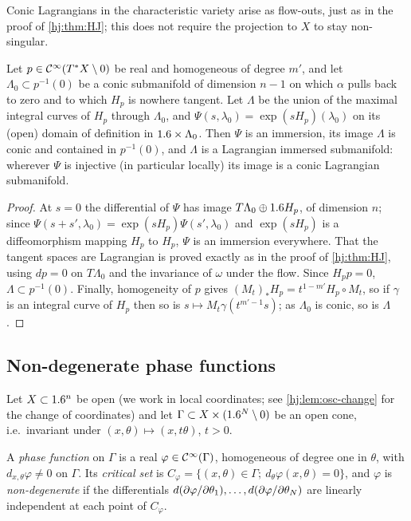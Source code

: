 Conic Lagrangians in the characteristic variety arise as flow-outs, just as in
the proof of \cref{hj:thm:HJ}; this does not require the projection to $X$ to
stay non-singular.

\begin{lemma}\label{hj:lem:flowout}
  Let $p\in\mathcal{C}^\infty(T^*X\setminus0)$ be real and homogeneous of degree $m'$, and let
  $\Lambda_0\subset p^{-1}(0)$ be a conic submanifold of dimension $n-1$ on which
  $\alpha$ pulls back to zero and to which $H_p$ is nowhere tangent.  Let
  $\Lambda$ be the union of the maximal integral curves of $H_p$ through
  $\Lambda_0$, and $\Psi(s,\lambda_0)=\exp(sH_p)(\lambda_0)$ on its (open) domain
  of definition in $1.6\times\Lambda_0$.  Then $\Psi$ is an immersion, its image
  $\Lambda$ is conic and contained in $p^{-1}(0)$, and $\Lambda$ is a Lagrangian
  immersed submanifold: wherever $\Psi$ is injective (in particular locally)
  its image is a conic Lagrangian submanifold.
\end{lemma}
\begin{proof}
  At $s=0$ the differential of $\Psi$ has image $T\Lambda_0\oplus1.6 H_p$, of
  dimension $n$; since $\Psi(s+s',\lambda_0)=\exp(sH_p)\Psi(s',\lambda_0)$ and
  $\exp(sH_p)$ is a diffeomorphism mapping $H_p$ to $H_p$, $\Psi$ is an
  immersion everywhere.  That the tangent spaces are Lagrangian is proved
  exactly as in the proof of \cref{hj:thm:HJ}, using $dp=0$ on $T\Lambda_0$ and
  the invariance of $\omega$ under the flow.  Since $H_pp=0$,
  $\Lambda\subset p^{-1}(0)$.  Finally, homogeneity of $p$ gives
  $(M_t)_*H_p=t^{1-m'}H_p\circ M_t$, so if $\gamma$ is an integral curve of $H_p$
  then so is $s\mapsto M_t\gamma(t^{m'-1}s)$; as $\Lambda_0$ is conic, so is
  $\Lambda$.
\end{proof}

\subsection{Non-degenerate phase functions}
Let $X\subset1.6^n$ be open (we work in local coordinates; see
\cref{hj:lem:osc-change} for the change of coordinates) and let
$\Gamma\subset X\times(1.6^N\setminus0)$ be an open cone, i.e.\ invariant under
$(x,\theta)\mapsto(x,t\theta)$, $t>0$.

\begin{definition}\label{hj:def:phase}
  A \emph{phase function} on $\Gamma$ is a real $\varphi\in\mathcal{C}^\infty(\Gamma)$,
  homogeneous of degree one in $\theta$, with $d_{x,\theta}\varphi\neq0$ on
  $\Gamma$.  Its \emph{critical set} is
  $C_\varphi=\{(x,\theta)\in\Gamma;\ d_\theta\varphi(x,\theta)=0\}$, and
  $\varphi$ is \emph{non-degenerate} if the differentials
  $d(\partial\varphi/\partial\theta_1),\dots,d(\partial\varphi/\partial\theta_N)$ are linearly
  independent at each point of $C_\varphi$.
\end{definition}

